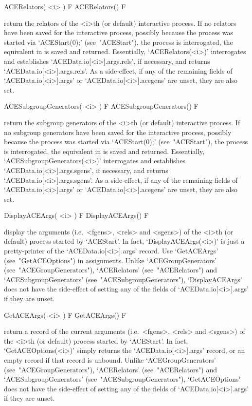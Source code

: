 \>ACERelators( <i> ) F
\>ACERelators() F

return the {\GAP} relators  of  the  <i>th  (or  default)  interactive
{\ACE} process. If no relators have been  saved  for  the  interactive
{\ACE}  process,  possibly  because  the  process  was   started   via
`ACEStart(0);' (see~"ACEStart"), the {\ACE} process  is  interrogated,
the  equivalent  in  {\GAP}  is  saved  and   returned.   Essentially,
`ACERelators(<i>)'     interrogates     {\ACE}     and     establishes
`ACEData.io[<i>].args.rels',     if     necessary,     and     returns
`ACEData.io[<i>].args.rels'. As a side-effect, if any of the remaining
fields  of  `ACEData.io[<i>].args'  or  `ACEData.io[<i>].acegens'  are
unset, they are also set.

\>ACESubgroupGenerators( <i> ) F
\>ACESubgroupGenerators() F

return the {\GAP}  subgroup  generators  of  the  <i>th  (or  default)
interactive {\ACE} process. If no subgroup generators have been  saved
for the interactive {\ACE} process, possibly because the  process  was
started via `ACEStart(0);' (see~"ACEStart"),  the  {\ACE}  process  is
interrogated,  the  equivalent  in  {\GAP}  is  saved  and   returned.
Essentially,  `ACESubgroupGenerators(<i>)'  interrogates  {\ACE}   and
establishes `ACEData.io[<i>].args.sgens', if  necessary,  and  returns
`ACEData.io[<i>].args.sgens'.  As  a  side-effect,  if  any   of   the
remaining       fields       of       `ACEData.io[<i>].args'        or
`ACEData.io[<i>].acegens' are unset, they are also set.

\>DisplayACEArgs( <i> ) F
\>DisplayACEArgs() F

display the arguments (i.e.~<fgens>, <rels> and <sgens>) of the  <i>th
(or   default)   process   started    by    `ACEStart'.    In    fact,
`DisplayACEArgs(<i>)'   is    just    a    pretty-printer    of    the
`ACEData.io[<i>].args' record. Use `GetACEArgs'  (see~"GetACEOptions")
in          assignments.          Unlike          `ACEGroupGenerators'
(see~"ACEGroupGenerators"),  `ACERelators'   (see~"ACERelators")   and
`ACESubgroupGenerators'                 (see~"ACESubgroupGenerators"),
`DisplayACEArgs' does not have the side-effect of setting any  of  the
fields of `ACEData.io[<i>].args' if they are unset.

\>GetACEArgs( <i> ) F
\>GetACEArgs() F

return a record of the current  arguments  (i.e.~<fgens>,  <rels>  and
<sgens>) of the <i>th (or default) process started by  `ACEStart'.  In
fact, `GetACEOptions(<i>)' simply returns  the  `ACEData.io[<i>].args'
record,  or  an  empty  record  if  that  record  is  unbound.  Unlike
`ACEGroupGenerators'     (see~"ACEGroupGenerators"),     `ACERelators'
(see~"ACERelators")            and             `ACESubgroupGenerators'
(see~"ACESubgroupGenerators"),  `GetACEOptions'  does  not  have   the
side-effect of setting any of the fields of `ACEData.io[<i>].args'  if
they are unset.

